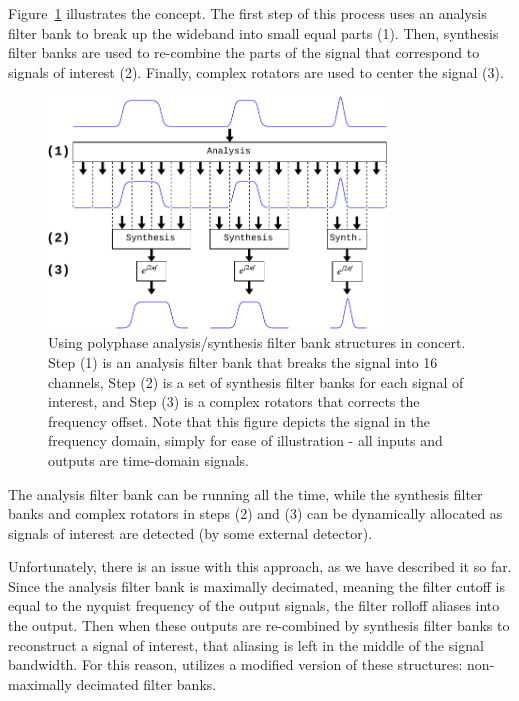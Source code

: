 \documentclass[12pt]{article}
\begin{document}
Figure~\ref{fig:analysis_and_synthesis} illustrates the concept.
The first step of this process uses an analysis
filter bank to break up the wideband into small equal parts (1). Then,
synthesis filter banks are used to re-combine the parts of the signal that
correspond to signals of interest (2). Finally, complex rotators are used to
center the signal (3). 

\begin{figure}[h!]
    \begin{center}
    \includegraphics[width=0.8\textwidth]{polyphase}%
    \end{center}
    \caption{
Using polyphase analysis/synthesis filter bank structures in concert. Step (1)
is an analysis filter bank that breaks the signal into 16 channels, Step (2) is
a set of synthesis filter banks for each signal of interest, and Step (3) is
a complex rotators that corrects the frequency offset. Note that this figure
depicts the signal in the frequency domain, simply for ease of illustration -
all inputs and outputs are time-domain signals.
    }
    \label{fig:analysis_and_synthesis}
\end{figure}

The analysis filter bank can be running all the time, while the synthesis
filter banks and complex rotators in steps (2) and (3) can be dynamically
allocated as signals of interest are detected (by some external detector).

Unfortunately, there is an issue with this approach, as we have described it so
far. Since the analysis filter bank is maximally decimated, meaning the filter
cutoff is equal to the nyquist frequency of the output signals, the filter
rolloff aliases into the output. Then when these outputs are re-combined by 
synthesis filter banks to reconstruct a signal of interest, that aliasing is left
in the middle of the signal bandwidth.  For this reason, \cite{Harris2} utilizes
a modified version of these structures: non-maximally decimated filter banks.
\end{document}
